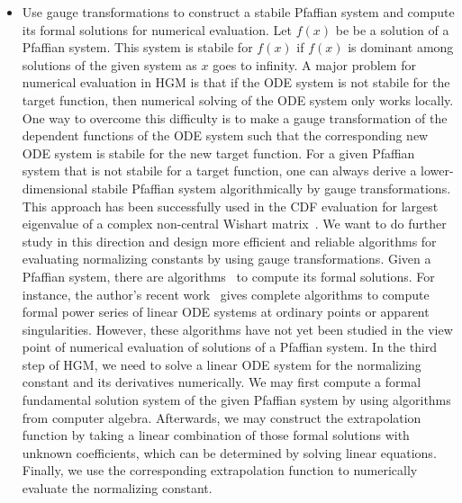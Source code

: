 \documentclass[10pt,a4paper]{article}
\begin{document}
\begin{itemize}
\item Use gauge transformations to construct a stabile Pfaffian system and compute its formal solutions for numerical evaluation. Let $f(x)$ be be a solution of a Pfaffian system. This system is stabile for $f(x)$ if $f(x)$ is dominant among solutions of the given system as $x$ goes to infinity. A major problem for numerical evaluation in HGM is that if the ODE system is not stabile for the target function, then numerical solving of the ODE system only works locally. One way to overcome this difficulty is to make a gauge transformation of the dependent functions of the ODE system such that the corresponding new ODE system is stabile for the new target function. For a given Pfaffian system that is not stabile for a target function, one can always derive a lower-dimensional stabile Pfaffian system algorithmically by gauge transformations. This approach has been successfully used in the CDF evaluation for largest eigenvalue of a complex non-central Wishart matrix~\cite{Danufane2018}. We want to do further study in this direction and design more efficient and reliable algorithms for evaluating normalizing constants by using gauge transformations.  
  Given a Pfaffian system, there are algorithms~\cite{Moser1959, Barkatou07, Yi2017} to compute its formal solutions. For instance, the author’s recent work~\cite{Yi2017} gives complete algorithms to compute formal power series of linear ODE systems at ordinary points or apparent singularities. However, these algorithms have not yet been studied in the view point of numerical evaluation of solutions of a Pfaffian system. In the third step of HGM, we need to solve a linear ODE system for the normalizing constant and its derivatives numerically. We may first compute a formal fundamental solution system of the given Pfaffian system by using algorithms from computer algebra. Afterwards, we may construct the extrapolation function by taking a linear combination of those formal solutions with unknown coefficients, which can be determined by solving linear equations. Finally, we use the corresponding extrapolation function to numerically evaluate the normalizing constant. 
\end{itemize}


\end{document}
